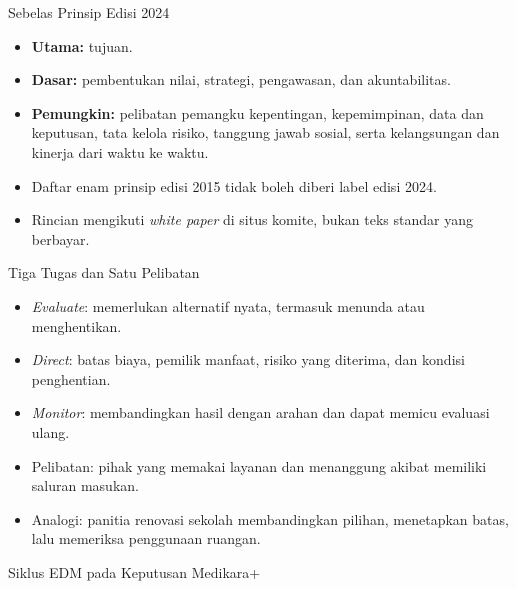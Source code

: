 \documentclass[aspectratio=169, table, 12pt]{beamer}
\begin{document}
\begin{frame}{{\Large Sebelas Prinsip Edisi 2024}}
  \vspace{4pt}
  \small
  \begin{itemize}
    \item \textbf{Utama:} tujuan.
    \item \textbf{Dasar:} pembentukan nilai, strategi, pengawasan, dan akuntabilitas.
    \item \textbf{Pemungkin:} pelibatan pemangku kepentingan, kepemimpinan, data dan keputusan, tata
          kelola risiko, tanggung jawab sosial, serta kelangsungan dan kinerja dari waktu ke waktu.
    \item Daftar enam prinsip edisi 2015 tidak boleh diberi label edisi 2024.
    \item Rincian mengikuti \textit{white paper} di situs komite, bukan teks standar yang berbayar.
  \end{itemize}
\end{frame}

\begin{frame}{{\Large Tiga Tugas dan Satu Pelibatan}}
  \vspace{4pt}
  \small
  \begin{itemize}
    \item \textit{Evaluate}: memerlukan alternatif nyata, termasuk menunda atau menghentikan.
    \item \textit{Direct}: batas biaya, pemilik manfaat, risiko yang diterima, dan kondisi
          penghentian.
    \item \textit{Monitor}: membandingkan hasil dengan arahan dan dapat memicu evaluasi ulang.
    \item Pelibatan: pihak yang memakai layanan dan menanggung akibat memiliki saluran masukan.
    \item Analogi: panitia renovasi sekolah membandingkan pilihan, menetapkan batas, lalu memeriksa
          penggunaan ruangan.
  \end{itemize}
\end{frame}

\begin{frame}{{\Large Siklus EDM pada Keputusan Medikara+}}
  \centering
  \vspace{6pt}
  \resizebox{0.96\textwidth}{!}{}
\end{frame}
\end{document}
